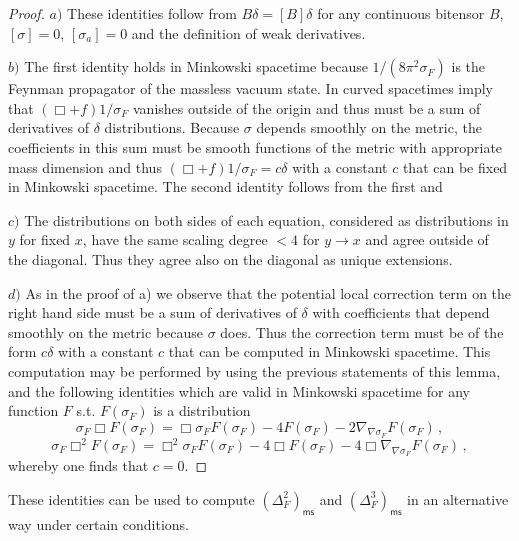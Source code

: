 \documentclass[10pt]{book}
\newcommand{\ms}{\mathsf{ms}}
\theoremstyle{break}
\begin{document}
\begin{proof}
$a)$ These identities follow from $B\delta=[B]\delta$ for any continuous bitensor $B$, $[\sigma]=0$, $[\sigma_a]=0$ and the definition of weak derivatives.

$b)$ The first identity holds in Minkowski spacetime because $1/(8\pi^2\sigma_F)$ is the Feynman propagator of the massless vacuum state. In curved spacetimes %
imply that $(\Box+f)1/\sigma_F$ vanishes outside of the origin and thus must be a sum of derivatives of $\delta$ distributions. Because $\sigma$ depends smoothly on the metric, the coefficients in this sum must be smooth functions of the metric with appropriate mass dimension and thus $(\Box+f)1/\sigma_F=c\delta$ with a constant $c$ that can be fixed in Minkowski spacetime. The second identity follows from the first and %

$c)$ The distributions on both sides of each equation, considered as distributions in $y$ for fixed $x$, have the same scaling degree $<4$ for $y\to x$ and agree outside of the diagonal. Thus they agree also on the diagonal as unique extensions.

$d)$ As in the proof of a) we observe that the potential local correction term on the right hand side must be a sum of derivatives of $\delta$ with coefficients that depend smoothly on the metric because $\sigma$ does. Thus the correction term must be of the form $c\delta$ with a constant $c$ that can be computed in Minkowski spacetime. This computation may be performed by using %
the previous statements of this lemma, and the following identities which are valid in Minkowski spacetime for any function $F$ s.t. $F(\sigma_F)$ is a distribution
$$\sigma_F\Box  F(\sigma_F)=\Box \sigma_F F(\sigma_F) - 4 F(\sigma_F) - 2\nabla_{\nabla\sigma_F}F(\sigma_F)\,,$$
$$\sigma_F\Box^2  F(\sigma_F)=\Box^2 \sigma_F F(\sigma_F) - 4 \Box F(\sigma_F) - 4\Box \nabla_{\nabla\sigma_F}F(\sigma_F)\,,$$
whereby one finds that $c=0$.
\end{proof}

These identities can be used to compute $\left(\Delta^2_F\right)_\ms$ and $\left(\Delta^3_F\right)_\ms$ in an alternative way under certain conditions.
\end{document}
